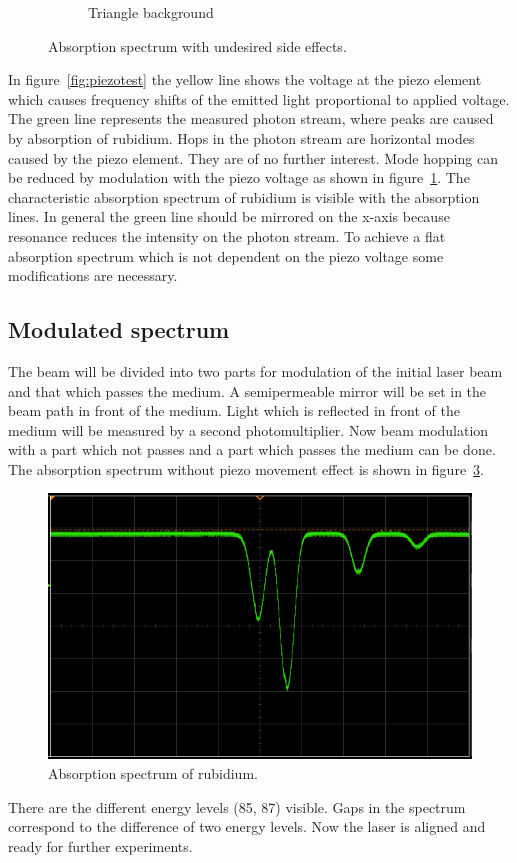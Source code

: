 \begin{figure}[ht]
\begin{subfigure}[b]{0.49\textwidth}
\begin{center}
						\caption{Triangle background}%
						\label{fig:rectangular}
				\end{center}
		\end{subfigure}
		\caption{Absorption spectrum with undesired side effects.}%
		\label{fig:}
\end{figure}
In figure~\ref{fig:piezotest} the yellow line shows the voltage at the piezo
element which causes frequency shifts of the emitted light proportional to
applied voltage.
The green line represents the measured photon stream, where peaks are caused by
absorption of rubidium.
Hops in the photon stream are horizontal modes caused by the piezo element.
They are of no further interest.
Mode hopping can be reduced by modulation with the piezo voltage as shown in
figure~\ref{fig:rectangular}.
The characteristic absorption spectrum of rubidium is visible with the
absorption lines.
In general the green line should be mirrored on the x-axis because resonance
reduces the intensity on the photon stream.
To achieve a flat absorption spectrum which is not dependent on the piezo voltage some
modifications are necessary.

\subsection{Modulated spectrum}%
\label{sub:modulated_spectrum}

The beam will be divided into two parts
for modulation of the initial laser beam and that which passes the medium.
A semipermeable mirror will be set in the beam path in front of the medium.
Light which is reflected in front of the medium will be measured by a second photomultiplier.
Now beam modulation with a part which not passes and a part which passes the
medium can be done.
The absorption spectrum without piezo movement effect is shown in figure~\ref{fig:modulation}.
\begin{figure}[ht]
		\centering
		\includegraphics[width=0.8\linewidth]{./content/pictures/scope_140.png}
		\caption{Absorption spectrum of rubidium.}%
		\label{fig:modulation}
\end{figure}
There are the different energy levels (85, 87) visible.
Gaps in the spectrum correspond to the difference of two energy levels.
Now the laser is aligned and ready for further experiments.
